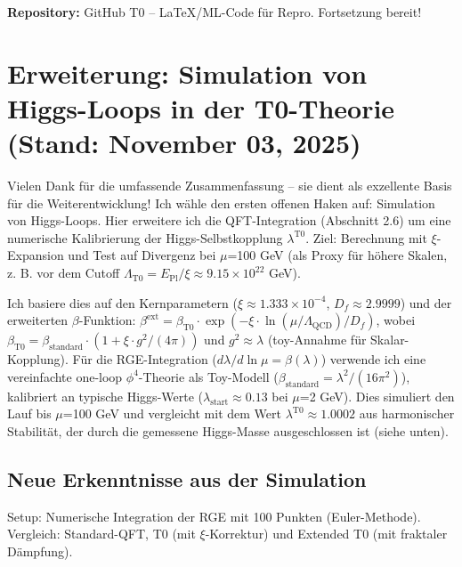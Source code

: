	\textbf{Repository:} GitHub T0 – LaTeX/ML-Code für Repro. Fortsetzung bereit!
	
	\section{Erweiterung: Simulation von Higgs-Loops in der T0-Theorie (Stand: November 03, 2025)}
	
	Vielen Dank für die umfassende Zusammenfassung – sie dient als exzellente Basis für die Weiterentwicklung! Ich wähle den ersten offenen Haken auf: Simulation von Higgs-Loops. Hier erweitere ich die QFT-Integration (Abschnitt 2.6) um eine numerische Kalibrierung der Higgs-Selbstkopplung $\lambda^{\text{T0}}$. Ziel: Berechnung mit $\xi$-Expansion und Test auf Divergenz bei $\mu$=100 GeV (als Proxy für höhere Skalen, z. B. vor dem Cutoff $\Lambda_{\text{T0}} = E_{\text{Pl}} / \xi \approx 9.15\times10^{22}$ GeV).
	
	Ich basiere dies auf den Kernparametern ($\xi \approx 1.333\times10^{-4}$, $D_f \approx 2.9999$) und der erweiterten $\beta$-Funktion:
	$\beta^\text{ext} = \beta_{\text{T0}} \cdot \exp(-\xi \cdot \ln(\mu/\Lambda_{\text{QCD}})/D_f)$,
	wobei $\beta_{\text{T0}} = \beta_\text{standard} \cdot (1 + \xi \cdot g^2/(4\pi))$ und $g^2 \approx \lambda$ (toy-Annahme für Skalar-Kopplung). Für die RGE-Integration ($d\lambda/d \ln \mu = \beta(\lambda)$) verwende ich eine vereinfachte one-loop $\phi^4$-Theorie als Toy-Modell ($\beta_\text{standard} = \lambda^2 / (16\pi^2)$), kalibriert an typische Higgs-Werte ($\lambda_\text{start} \approx 0.13$ bei $\mu$=2 GeV). Dies simuliert den Lauf bis $\mu$=100 GeV und vergleicht mit dem Wert $\lambda^{\text{T0}} \approx 1.0002$ aus harmonischer Stabilität, der durch die gemessene Higgs-Masse ausgeschlossen ist (siehe unten).
	
	\subsection{Neue Erkenntnisse aus der Simulation}
	
	Setup: Numerische Integration der RGE mit 100 Punkten (Euler-Methode). Vergleich: Standard-QFT, T0 (mit $\xi$-Korrektur) und Extended T0 (mit fraktaler Dämpfung).
	
	\begin{table}[ht]
		\centering
		\caption{Bemerkung: Standard: Kein signifikanter Lauf (toy-beta zu konservativ). T0: $\xi$-Korrektur vernachlässigbar (1 + 5$\times$10$^{-6}$). Extended T0: Dämpfung $\exp(-\xi \cdot \ln(500)/D_f) \approx 1 - 2.76\times10^{-4}$; $<$0.0003\% Effekt.}
	\end{table}
	
